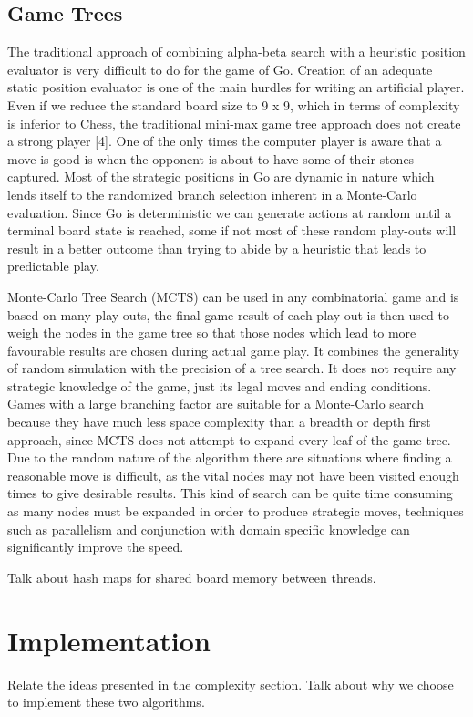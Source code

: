 \documentclass[conference]{IEEEtran}
\begin{document}
\subsection{Game Trees}
The traditional approach of combining alpha-beta search with a heuristic position evaluator is very difficult to do for the game of Go. Creation of an adequate static position evaluator is one of the main hurdles for writing an artificial player. Even if we reduce the standard board size to 9 x 9, which in terms of complexity is inferior to Chess, the traditional mini-max game tree approach does not create a strong player [4]. One of the only times the computer player is aware that a move is good is when the opponent is about to have some of their stones captured. Most of the strategic positions in Go are dynamic in nature which lends itself to the randomized branch selection inherent in a Monte-Carlo evaluation. Since Go is deterministic we can generate actions at random until a terminal board state is reached, some if not most of these random play-outs will result in a better outcome than trying to abide by a heuristic that leads to predictable play.\par
Monte-Carlo Tree Search (MCTS) can be used in any combinatorial game and is based on many play-outs, the final game result of each play-out is then used to weigh the nodes in the game tree so that those nodes which lead to more favourable results are chosen during actual game play. It combines the generality of random simulation with the precision of a tree search. It does not require any strategic knowledge of the game, just its legal moves and ending conditions. Games with a large branching factor are suitable for a Monte-Carlo search because they have much less space complexity than a breadth or depth first approach, since MCTS does not attempt to expand every leaf of the game tree. Due to the random nature of the algorithm there are situations where finding a reasonable move is difficult, as the vital nodes may not have been visited enough times to give desirable results. This kind of search can be quite time consuming as many nodes must be expanded in order to produce strategic moves, techniques such as parallelism and conjunction with domain specific knowledge can significantly improve the speed.\par
Talk about hash maps for shared board memory between threads.

\section{Implementation}
Relate the ideas presented in the complexity section. Talk about why we choose to implement these two algorithms.
\end{document}
